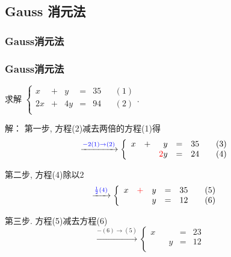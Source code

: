 \subsection{Gauss 消元法}


\subsubsection{Gauss消元法}
\begin{frame}\frametitle{Gauss消元法}
\begin{example}[鸡兔同笼]
求解 $\left\{\begin{array}{rrrrrrr}
x& +& y &= & 35 && (1) \\
2x& + & 4y& = & 94 && (2)\\
\end{array}\right.$.
\end{example}
\pp
\bigskip

解：
第一步, 方程(2)减去两倍的方程(1)得
\[\xrightarrow{\blue{-2(1)\rightarrow(2)}} \left\{\begin{array}{rrrrrrr}
x& +& y &= & 35 && (3) \\
&  & \red{2}y& = & 24 && (4)\\
\end{array}\right.\]
\pp
\bigskip

第二步, 方程(4)除以$2$
\[\xrightarrow{\blue{\frac12(4)}}\left\{\begin{array}{rrrrrrr}
x& \red{+}& y &= & 35 && (5) \\
&  & y& = & 12 && (6)\\
\end{array}\right.\]
\pp
\bigskip

第三步. 方程(5)减去方程(6)
\[\xrightarrow{-(6)\rightarrow(5)}\left\{\begin{array}{rrrrrrr}
x& & &= & 23 && \\
&  & y& = & 12 &&\\
\end{array}\right.\]
\end{frame}





